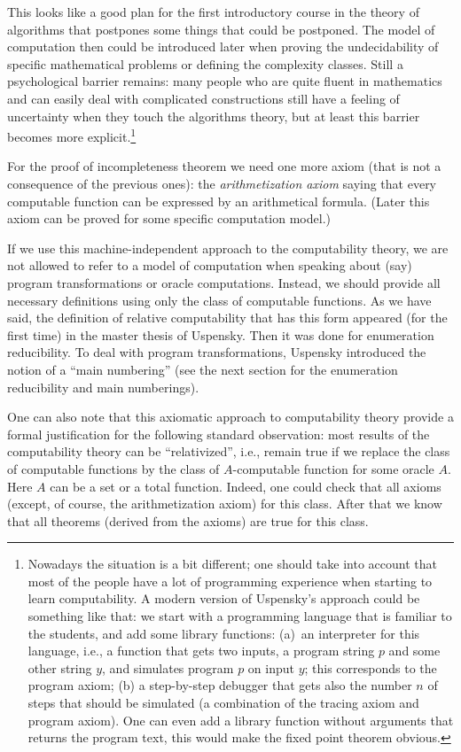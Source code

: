 \documentclass[12pt]{article}
\theoremstyle{remark}
\begin{document}
This looks like a good plan for the first introductory course in the theory of algorithms that postpones some things that could be postponed. The model of computation then could be introduced later when proving the undecidability of specific mathematical problems or defining the complexity classes. Still a psychological barrier remains: many people who are quite fluent in mathematics and can easily deal with complicated constructions still have a feeling of uncertainty when they touch the algorithms theory, but at least this barrier becomes more explicit.\footnote{Nowadays the situation is a bit different; one should take into account that most of the people have a lot of programming experience when starting to learn computability. A modern version of Uspensky's approach could be something like that: we start with a programming language that is familiar to the students, and add some library functions: (a)~an interpreter for this language, i.e., a function that gets two inputs, a program string $p$ and some other string $y$, and simulates program $p$ on input $y$; this corresponds to the program axiom; (b) a step-by-step debugger that gets also the number $n$ of steps that should be simulated (a combination of the tracing axiom and program axiom). One can even add a library function without arguments that returns the program text, this would make the fixed point theorem obvious.}

For the proof of incompleteness theorem we need one more axiom (that is not a consequence of the previous ones): the \emph{arithmetization axiom} saying that every computable function can be expressed by an arithmetical formula. (Later this axiom can be proved for some specific computation model.)

If we use this machine-independent approach to the computability theory, we are not allowed to refer to a model of computation when speaking about (say) program transformations or oracle computations. Instead, we should provide all necessary definitions using only the class of computable functions. As we have said, the definition of relative computability that has this form appeared (for the first time) in the master thesis of Uspensky. Then it was done for enumeration reducibility. To deal with program transformations, Uspensky introduced the notion of a ``main numbering'' (see the next section for the enumeration reducibility and main numberings).

One can also note that this axiomatic approach to computability theory provide a formal justification for the following standard observation: most results of the computability theory can be ``relativized'', i.e., remain true if we replace the class of computable functions by the class of $A$-computable function for some oracle $A$. Here $A$ can be a set or a total function. Indeed, one could check that all axioms (except, of course, the arithmetization axiom) for this class. After that we know that all theorems (derived from the axioms) are true for this class.
\end{document}
